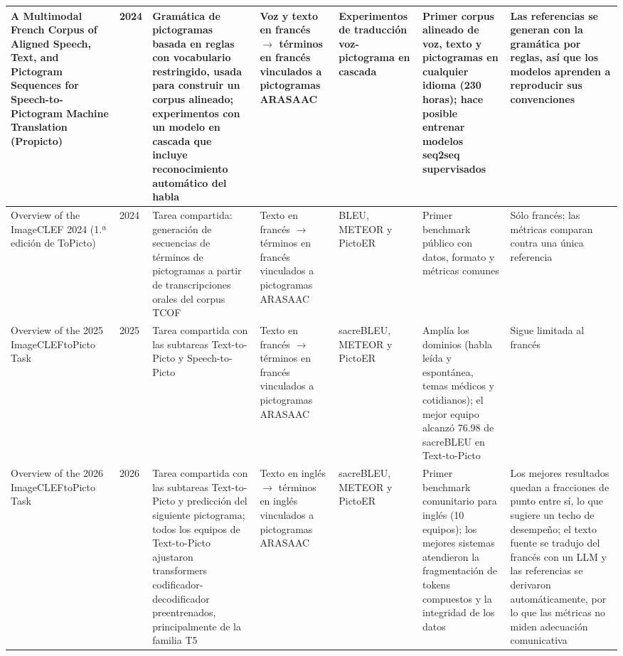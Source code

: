 \begin{landscape}
\begin{longtable}{L{3cm} L{1.3cm} L{3.4cm} L{2.6cm} L{2.4cm} L{3.7cm} L{3.7cm}}
A Multimodal French Corpus of Aligned Speech, Text, and Pictogram Sequences for Speech-to-Pictogram Machine Translation (Propicto) \cite{macaire2024} & 2024 &
Gramática de pictogramas basada en reglas con vocabulario restringido, usada para construir un corpus alineado; experimentos con un modelo en cascada que incluye reconocimiento automático del habla &
Voz y texto en francés $\rightarrow$ términos en francés vinculados a pictogramas ARASAAC &
Experimentos de traducción voz-pictograma en cascada &
Primer corpus alineado de voz, texto y pictogramas en cualquier idioma (230 horas); hace posible entrenar modelos seq2seq supervisados &
Las referencias se generan con la gramática por reglas, así que los modelos aprenden a reproducir sus convenciones \\
\midrule

Overview of the ImageCLEF 2024 (1.ª edición de ToPicto) \cite{ionescu2024} & 2024 &
Tarea compartida: generación de secuencias de términos de pictogramas a partir de transcripciones orales del corpus TCOF &
Texto en francés $\rightarrow$ términos en francés vinculados a pictogramas ARASAAC &
BLEU, METEOR y PictoER &
Primer benchmark público con datos, formato y métricas comunes &
Sólo francés; las métricas comparan contra una única referencia \\
\midrule

Overview of the 2025 ImageCLEFtoPicto Task \cite{macaire2025overview} & 2025 &
Tarea compartida con las subtareas Text-to-Picto y Speech-to-Picto &
Texto en francés $\rightarrow$ términos en francés vinculados a pictogramas ARASAAC &
sacreBLEU, METEOR y PictoER &
Amplía los dominios (habla leída y espontánea, temas médicos y cotidianos); el mejor equipo alcanzó 76.98 de sacreBLEU en Text-to-Picto &
Sigue limitada al francés \\
\midrule

Overview of the 2026 ImageCLEFtoPicto Task \cite{Hjuler2026} & 2026 &
Tarea compartida con las subtareas Text-to-Picto y predicción del siguiente pictograma; todos los equipos de Text-to-Picto ajustaron transformers codificador-decodificador preentrenados, principalmente de la familia T5 &
Texto en inglés $\rightarrow$ términos en inglés vinculados a pictogramas ARASAAC &
sacreBLEU, METEOR y PictoER &
Primer benchmark comunitario para inglés (10 equipos); los mejores sistemas atendieron la fragmentación de tokens compuestos y la integridad de los datos &
Los mejores resultados quedan a fracciones de punto entre sí, lo que sugiere un techo de desempeño; el texto fuente se tradujo del francés con un LLM y las referencias se derivaron automáticamente, por lo que las métricas no miden adecuación comunicativa \\
\end{longtable}



\end{landscape}

